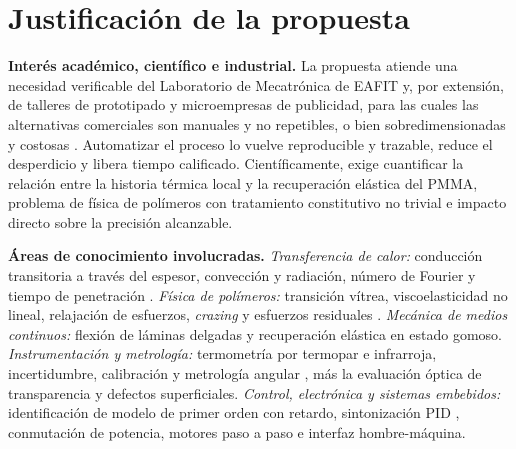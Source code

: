 \section{Justificación de la propuesta}

\noindent\textbf{Interés académico, científico e industrial.} La propuesta atiende una necesidad verificable del Laboratorio de Mecatrónica de EAFIT y, por extensión, de talleres de prototipado y microempresas de publicidad, para las cuales las alternativas comerciales son manuales y no repetibles, o bien sobredimensionadas y costosas \cite{shannon_line,mic_auto}. Automatizar el proceso lo vuelve reproducible y trazable, reduce el desperdicio y libera tiempo calificado. Científicamente, exige cuantificar la relación entre la historia térmica local y la recuperación elástica del PMMA, problema de física de polímeros con tratamiento constitutivo no trivial \cite{gilormini2010} e impacto directo sobre la precisión alcanzable.

\noindent\textbf{Áreas de conocimiento involucradas.} \emph{Transferencia de calor:} conducción transitoria a través del espesor, convección y radiación, número de Fourier y tiempo de penetración \cite{incropera2011}. \emph{Física de polímeros:} transición vítrea, viscoelasticidad no lineal, relajación de esfuerzos, \emph{crazing} y esfuerzos residuales \cite{osswald2012,gilormini2010,yan2023}. \emph{Mecánica de medios continuos:} flexión de láminas delgadas y recuperación elástica en estado gomoso. \emph{Instrumentación y metrología:} termometría por termopar e infrarroja, incertidumbre, calibración y metrología angular \cite{iso17025}, más la evaluación óptica de transparencia y defectos superficiales. \emph{Control, electrónica y sistemas embebidos:} identificación de modelo de primer orden con retardo, sintonización PID \cite{astrom2006}, conmutación de potencia, motores paso a paso e interfaz hombre-máquina.
